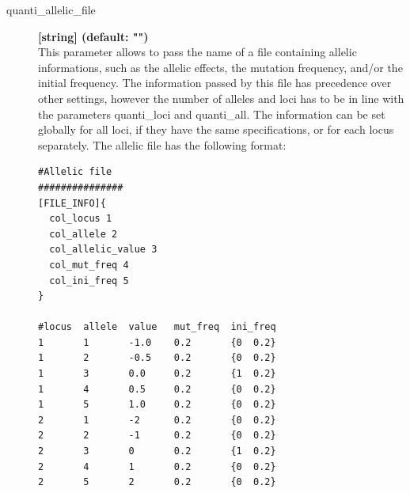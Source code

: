 \documentclass[letterpaper,12pt,oneside]{book}
\begin{document}
\begin{description}
\item[\label{allelicFile}quanti\_allelic\_file]  \textbf{[string] (default: "")} \\
This parameter allows to pass the name of a file containing allelic informations, such as the allelic effects, the mutation frequency, and/or the initial frequency. The information passed by this file has precedence over other settings, however the number of alleles and loci has to be in line with the parameters \textsf{quanti\_loci} and \textsf{quanti\_all}. The information can be set globally for all loci, if they have the same specifications, or for each locus separately. The allelic file has the following format:

\begin{lstlisting}[frame=single]
#Allelic file 
###############
[FILE_INFO]{
  col_locus 1
  col_allele 2
  col_allelic_value 3
  col_mut_freq 4
  col_ini_freq 5
}

#locus  allele  value   mut_freq  ini_freq  
1       1       -1.0    0.2       {0  0.2}
1       2       -0.5    0.2       {0  0.2}
1       3       0.0     0.2       {1  0.2}
1       4       0.5     0.2       {0  0.2}
1       5       1.0     0.2       {0  0.2}
2       1       -2      0.2       {0  0.2}
2       2       -1      0.2       {0  0.2}
2       3       0       0.2       {1  0.2}
2       4       1       0.2       {0  0.2}
2       5       2       0.2       {0  0.2}
\end{lstlisting}


\end{description}
\end{document}
